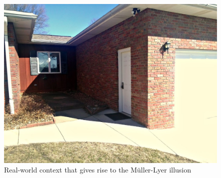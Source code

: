 \documentclass[journal]{vgtc}\usepackage{graphicx, color}
\begin{document}
\begin{figure}[h!t]\centering
\includegraphics[keepaspectratio=TRUE,width=\linewidth]{images/mullerlyerhouse}
\caption{Real-world context that gives rise to the M\"uller-Lyer illusion}\label{fig:mullerlyerreal}
\end{figure}
\end{document}
